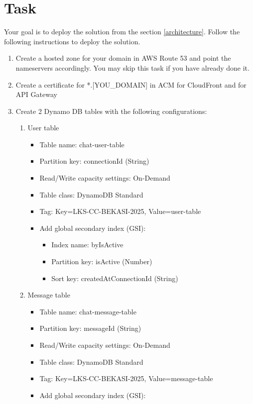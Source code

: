 \documentclass{article}
\begin{document}
\section{Task}
Your goal is to deploy the solution from the section \ref{architecture}. Follow the following instructions to deploy the solution.
\begin{enumerate}
\item \label{create_r53} Create a hosted zone for your domain in AWS Route 53 and point the nameservers accordingly. You may skip this task if you have already done it.
\item \label{create_acm} Create a certificate for *.[YOU\_DOMAIN] in ACM for CloudFront and for API Gateway
\item \label{create_ddb} Create 2 Dynamo DB tables with the following configurations:
  \begin{enumerate}
    \item User table
    \begin{itemize}
      \item Table name: chat-user-table
      \item Partition key: connectionId (String)
      \item Read/Write capacity settings: On-Demand
      \item Table class: DynamoDB Standard
      \item Tag: Key=LKS-CC-BEKASI-2025, Value=user-table
      \item Add global secondary index (GSI):
      \begin{itemize}
        \item Index name: byIsActive
        \item Partition key: isActive (Number)
        \item Sort key: createdAtConnectionId (String)
      \end{itemize}
    \end{itemize}
    \item Message table
    \begin{itemize}
      \item Table name: chat-message-table
      \item Partition key: messageId (String)
      \item Read/Write capacity settings: On-Demand
      \item Table class: DynamoDB Standard
      \item Tag: Key=LKS-CC-BEKASI-2025, Value=message-table
      \item Add global secondary index (GSI):

\end{itemize}
\end{enumerate}
\end{enumerate}
\end{document}
